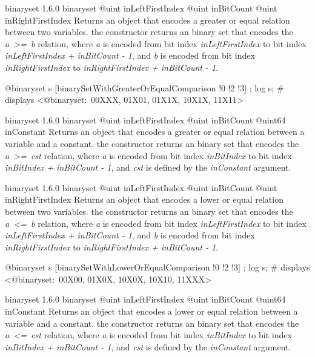 {binaryset}
{1.6.0}
{binaryset}
{@uint inLeftFirstIndex}
{@uint inBitCount}
{@uint inRightFirstIndex}
{Returns an  object that encodes a greater or equal relation between two variables.}
{the constructor returns an binary set that encodes the \emph{a~>=~b} relation, where \emph{a} is encoded from bit index \emph{inLeftFirstIndex} to bit index \emph{inLeftFirstIndex  + inBitCount - 1}, and \emph{b} is encoded from bit index \emph{inRightFirstIndex} to \emph{inRightFirstIndex + inBitCount - 1}.}

\exempleDeuxLignes
{}
{@binaryset s [binarySetWithGreaterOrEqualComparison !0 !2 !3] ;}
{log s; \# displays <@binaryset:~00XXX, 01X01, 01X1X, 10X1X, 11X11>}





{binaryset}
{1.6.0}
{binaryset}
{@uint inLeftFirstIndex}
{@uint inBitCount}
{@uint64 inConstant}
{Returns an  object that encodes a greater or equal relation between a variable and a constant.}
{the constructor returns an binary set that encodes the \emph{a~>=~cst} relation, where \emph {a} is encoded from bit index \emph{inBitIndex} to bit index \emph{inBitIndex  + inBitCount - 1}, and \emph{cst} is defined by the \emph{inConstant} argument.}





{binaryset}
{1.6.0}
{binaryset}
{@uint inLeftFirstIndex}
{@uint inBitCount}
{@uint inRightFirstIndex}
{Returns an  object that encodes a lower or equal relation between two variables.}
{the constructor returns an binary set that encodes the \emph{a~<=~b} relation, where \emph{a} is encoded from bit index \emph{inLeftFirstIndex} to bit index \emph{inLeftFirstIndex  + inBitCount - 1}, and \emph{b} is encoded from bit index \emph{inRightFirstIndex} to \emph{inRightFirstIndex + inBitCount - 1}.}

\exempleDeuxLignes
{}
{@binaryset s [binarySetWithLowerOrEqualComparison !0 !2 !3] ;}
{log s; \# displays <@binaryset:~00X00, 01X0X, 10X0X, 10X10, 11XXX>}





{binaryset}
{1.6.0}
{binaryset}
{@uint inLeftFirstIndex}
{@uint inBitCount}
{@uint64 inConstant}
{Returns an  object that encodes a lower or equal relation between a variable and a constant.}
{the constructor returns an binary set that encodes the \emph{a~<=~cst} relation, where \emph {a} is encoded from bit index \emph{inBitIndex} to bit index \emph{inBitIndex  + inBitCount - 1}, and \emph{cst} is defined by the \emph{inConstant} argument.}





